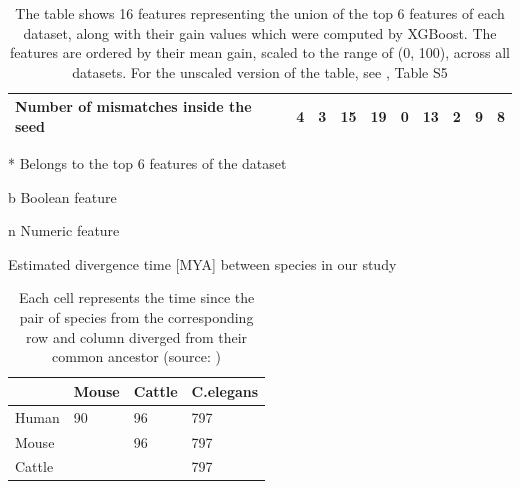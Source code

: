 \documentclass{bmcart}
\begin{document}
\begin{backmatter}
\begin{table}[h!]
\begin{threeparttable}
{\begin{tabular}{|l|l|l|l|l|l|l|l|l|l|}
\textbf{Number of mismatches inside the seed\tnote{n}}    & 4            & 3            & 15           & 19\tnote{*}          & 0           & 13          & 2           & 9           & 8             \\ \hline
\end{tabular}}
\begin{tablenotes}\footnotesize
\item[*] Belongs to the top 6 features of the dataset
\item[b] Boolean feature
\item[n] Numeric feature

\end{tablenotes}
 \end{threeparttable}
 \caption*{The table shows 16 features representing the union of the top 6 features of each dataset, along with their gain values which were computed by XGBoost. The features are ordered by their mean gain, scaled to the range of (0, 100), across all datasets. For the unscaled version of the table, see , Table S5}
\end{table}

\begin{table}[h!]
\caption{Estimated divergence time {[}MYA{]} between species in our study}
\label{tab:evolutiontime}
\centering
\begin{tabular}{|l|l|l|l|}
\hline
             & Mouse & Cattle & C.elegans \\ \hline
Human & 90  & 96         & 797                    \\ \hline
Mouse          &     & 96         & 797                    \\ \hline
Cattle   &     &            & 797                    \\ \hline
\end{tabular}
\caption*{Each cell represents the time since the pair of species from the corresponding row and column diverged from their common ancestor (source: \cite{kumar2017timetree})}
\end{table}


\end{backmatter}
\end{document}

